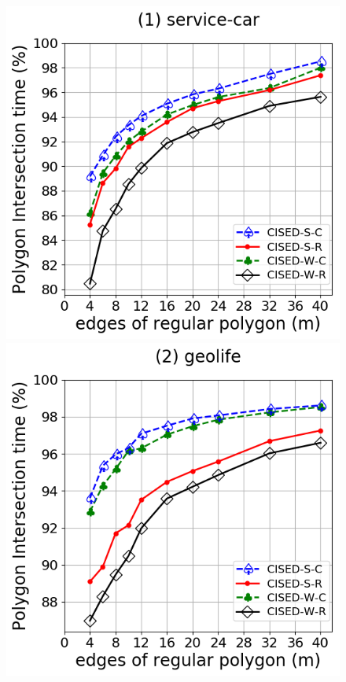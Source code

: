 {\begin{figure}[tb!]
	\centering
	\includegraphics[scale = 0.290]{Figures/Exp-M-poly-time-ratio-service.png}\hspace{1ex}
	\includegraphics[scale = 0.290]{Figures/Exp-M-poly-time-ratio-geolife.png}\hspace{1ex}

\end{figure}}
